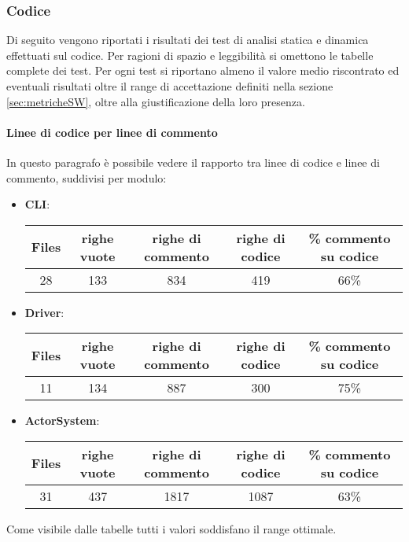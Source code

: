 \documentclass{scalatekids-article}
\begin{document}
\subsubsection{Codice}
Di seguito vengono riportati i risultati dei test di analisi statica e dinamica effettuati sul codice.
Per ragioni di spazio e leggibilità si omettono le tabelle complete dei test. Per ogni test si riportano almeno il valore medio riscontrato ed eventuali risultati oltre il range di accettazione definiti nella sezione \ref{sec:metricheSW}, oltre alla giustificazione della loro presenza.

\paragraph{Linee di codice per linee di commento}
In questo paragrafo è possibile vedere il rapporto tra linee di codice e
linee di commento, suddivisi per modulo:
\begin{itemize}
	
	\item \textbf{CLI}:
	\begin{center}
		\begin{tabular}{| c | c | c | c | c |}
			\hline
			Files & righe vuote & righe di commento & righe di codice & \% commento su codice\\
			\hline
			28 & 133 & 834 & 419 & 66\% \\
			\hline
		\end{tabular}
	\end{center}
	
	\item \textbf{Driver}:
	\begin{center}
		\begin{tabular}{| c | c | c | c | c |}
			\hline
			Files & righe vuote & righe di commento & righe di codice & \% commento su codice\\
			\hline
			11 & 134 & 887 & 300 & 75\% \\
			\hline
		\end{tabular}
	\end{center}
	
	\item \textbf{ActorSystem}:
	\begin{center}
		\begin{tabular}{| c | c | c | c | c |}
			\hline
			Files & righe vuote & righe di commento & righe di codice & \% commento su codice\\
			\hline
			31 & 437 & 1817 & 1087 & 63\% \\
			\hline
		\end{tabular}
	\end{center}
\end{itemize}
Come visibile dalle tabelle tutti i valori soddisfano il range ottimale.
\end{document}
